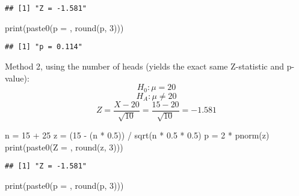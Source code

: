 \documentclass[
]{article}
\newenvironment{Shaded}{\begin{snugshade}}{\end{snugshade}}
\newcommand{\DecValTok}[1]{\textcolor[rgb]{0.00,0.00,0.81}{#1}}
\newcommand{\FloatTok}[1]{\textcolor[rgb]{0.00,0.00,0.81}{#1}}
\newcommand{\FunctionTok}[1]{\textcolor[rgb]{0.00,0.00,0.00}{#1}}
\newcommand{\NormalTok}[1]{#1}
\newcommand{\OtherTok}[1]{\textcolor[rgb]{0.56,0.35,0.01}{#1}}
\newcommand{\SpecialCharTok}[1]{\textcolor[rgb]{0.00,0.00,0.00}{#1}}
\newcommand{\StringTok}[1]{\textcolor[rgb]{0.31,0.60,0.02}{#1}}
\begin{document}
\begin{verbatim}
## [1] "Z = -1.581"
\end{verbatim}

\begin{Shaded}
\begin{Highlighting}[]
\FunctionTok{print}\NormalTok{(}\FunctionTok{paste0}\NormalTok{(}\StringTok{\textquotesingle{}p = \textquotesingle{}}\NormalTok{, }\FunctionTok{round}\NormalTok{(p, }\DecValTok{3}\NormalTok{)))}
\end{Highlighting}
\end{Shaded}

\begin{verbatim}
## [1] "p = 0.114"
\end{verbatim}

Method 2, using the number of heads (yields the exact same Z-statistic
and p-value):\\
\[H_0: \mu = 20\] \[H_A: \mu \neq 20\]
\[Z = \frac{X - 20}{\sqrt{10}} = \frac{15-20}{\sqrt{10}} = -1.581\]

\begin{Shaded}
\begin{Highlighting}[]
\NormalTok{n }\OtherTok{=} \DecValTok{15} \SpecialCharTok{+} \DecValTok{25}
\NormalTok{z }\OtherTok{=}\NormalTok{ (}\DecValTok{15} \SpecialCharTok{{-}}\NormalTok{ (n }\SpecialCharTok{*} \FloatTok{0.5}\NormalTok{)) }\SpecialCharTok{/} \FunctionTok{sqrt}\NormalTok{(n }\SpecialCharTok{*} \FloatTok{0.5} \SpecialCharTok{*} \FloatTok{0.5}\NormalTok{)}
\NormalTok{p }\OtherTok{=} \DecValTok{2} \SpecialCharTok{*} \FunctionTok{pnorm}\NormalTok{(z)}
\FunctionTok{print}\NormalTok{(}\FunctionTok{paste0}\NormalTok{(}\StringTok{\textquotesingle{}Z = \textquotesingle{}}\NormalTok{, }\FunctionTok{round}\NormalTok{(z, }\DecValTok{3}\NormalTok{)))}
\end{Highlighting}
\end{Shaded}

\begin{verbatim}
## [1] "Z = -1.581"
\end{verbatim}

\begin{Shaded}
\begin{Highlighting}[]
\FunctionTok{print}\NormalTok{(}\FunctionTok{paste0}\NormalTok{(}\StringTok{\textquotesingle{}p = \textquotesingle{}}\NormalTok{, }\FunctionTok{round}\NormalTok{(p, }\DecValTok{3}\NormalTok{)))}
\end{Highlighting}
\end{Shaded}
\end{document}

